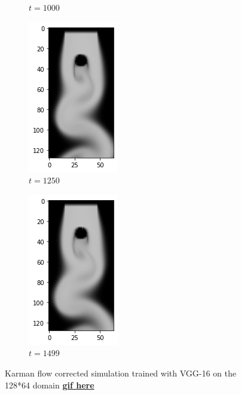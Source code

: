 \documentclass[a4paper,12pt,twoside]{report}
\begin{document}
\begin{figure}
\begin{subfigure}{0.18\textwidth}
		\caption{$t=1000$}
	\end{subfigure}
	\begin{subfigure}{0.18\textwidth}
		\centering
		\includegraphics[scale=0.5]{karmanflow/vgg_density_001250.png}
		\caption{$t=1250$}
	\end{subfigure}
	\begin{subfigure}{0.18\textwidth}
		\centering
		\includegraphics[scale=0.5]{karmanflow/vgg_density_001499.png}
		\caption{$t=1499$}
	\end{subfigure}
	\caption{Karman flow corrected simulation trained with VGG-16 on the 128*64 domain \href{https://github.com/w191444052/sol-data/blob/master/karman_high/vgg.gif}{\bf{gif here}}}
	\label{sol karman high vgg}
\end{figure}
\end{document}
